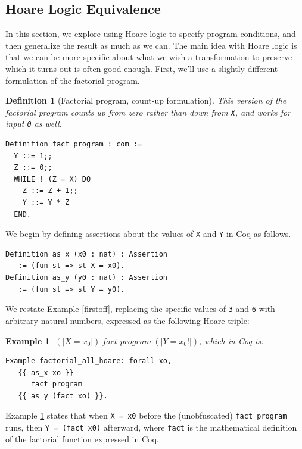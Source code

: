 \documentclass[compsoc,conference,a4paper,10pt,times]{IEEEtran}
\newtheorem{defin}[theorem]{Definition}
\newtheorem{example}[theorem]{Example}
\begin{document}
\subsection{Hoare Logic Equivalence}\label{hoarequiv}

In this section, we explore using Hoare logic to specify program conditions, and then generalize the result as much as we can.  The main idea with Hoare logic is that we can be more specific about what we wish a transformation to preserve which it turns out is often good enough. %
First, we'll use a slightly different formulation of the factorial program.

\begin{defin}[Factorial program, count-up formulation]\label{def:factup}
This version of the factorial program counts up from zero rather than down from \texttt{X}, and works for input \texttt{0} as well.
\begin{verbatim}
Definition fact_program : com :=
  Y ::= 1;;
  Z ::= 0;;
  WHILE ! (Z = X) DO
    Z ::= Z + 1;;
    Y ::= Y * Z
  END.
\end{verbatim}
\end{defin}

We begin by defining assertions about the values of \texttt{X} and \texttt{Y} in Coq as follows.
\begin{verbatim}
Definition as_x (x0 : nat) : Assertion 
   := (fun st => st X = x0).
Definition as_y (y0 : nat) : Assertion 
   := (fun st => st Y = y0).
\end{verbatim}
We restate Example \ref{firstoff}, replacing the specific values of \texttt{3} and \texttt{6} with arbitrary natural numbers, expressed as the following Hoare triple:
\begin{example}\label{hoareexample1}
    $
     (|X=x_0|)\ fact\_program\ (|Y=x_0!|)
    $,
which in Coq is:
\begin{verbatim}
Example factorial_all_hoare: forall xo,
   {{ as_x xo }} 
      fact_program 
   {{ as_y (fact xo) }}.
\end{verbatim}
\end{example}
Example \ref{hoareexample1} states that when \texttt{X = x0} before the (unobfuscated) \texttt{fact\_program} runs, then \texttt{Y = (fact x0)} afterward,
where \texttt{fact} is the mathematical definition of the factorial function expressed in Coq.
\end{document}
